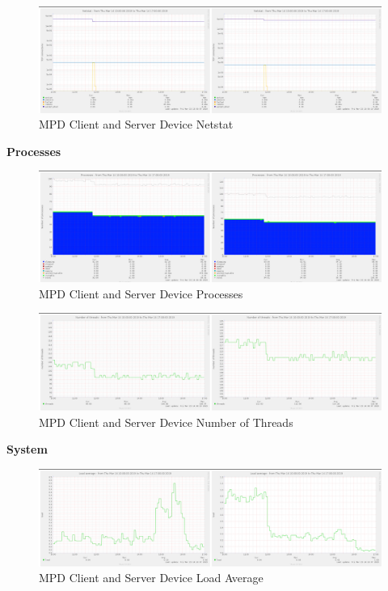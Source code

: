 \documentclass[11pt,a4paper,headinclude=false,footinclude=false]{scrreprt}
\begin{document}
\begin{figure}[H]
\includegraphics{ResultsAndAnalysis/MPDServerTestImages/017MPDNetstat.png}
\centering
\caption{MPD Client and Server Device Netstat}
\label{MPDNetstat}
\end{figure}

\textbf{Processes}

\begin{figure}[H]
\includegraphics{ResultsAndAnalysis/MPDServerTestImages/019MPDProcesses.png}
\centering
\caption{MPD Client and Server Device Processes}
\label{MPDProcesses}
\end{figure}

\begin{figure}[H]
\includegraphics{ResultsAndAnalysis/MPDServerTestImages/018MPDNoOfThreads.png}
\centering
\caption{MPD Client and Server Device Number of Threads}
\label{MPDNumThreads}
\end{figure}

\textbf{System}

\begin{figure}[H]
\includegraphics{ResultsAndAnalysis/MPDServerTestImages/015MPDLoadAverage.png}
\centering
\caption{MPD Client and Server Device Load Average}
\label{MPDLoadAvg}
\end{figure}
\end{document}

